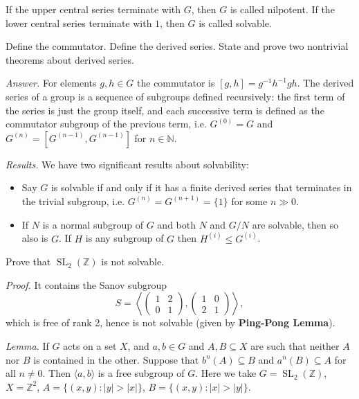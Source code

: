 \documentclass{mathproblems}
\newcommand\Z{\mathbb{Z}}
\begin{document}
\begin{questions}
If the upper central series terminate with $G$, then $G$ is called nilpotent. If the lower central series terminate with $1$, then $G$ is called solvable.


\miquestion
{\color{blue} Define the commutator. Define the derived series. State and prove two nontrivial theorems about derived series.}

\textit{Answer.} For elements $g,h\in G$ the commutator is $[g,h]=g^{-1}h^{-1}gh$. The derived series of a group is a sequence of subgroups defined recursively: the first term of the series is just the group itself, and each successive term is defined as the commutator subgroup of the previous term, i.e. $G^{(0)}=G$ and $G^{(n)}=[G^{(n-1)},G^{(n-1)}]$ for $n\in\mathbb{N}$. 

\textit{Results.} We have two significant results about solvability: \vspace{-4pt}
\begin{itemize}
\item Say $G$ is solvable if and only if it has a finite derived series that terminates in the trivial subgroup, i.e. $G^{(n)}=G^{(n+1)}=\{1\}$ for some $n\gg 0$.
\item If $N$ is a normal subgroup of $G$ and both $N$ and $G/N$ are solvable, then so also is $G$. If $H$ is any subgroup of $G$ then $H^{(i)}\leq G^{(i)}$.
\end{itemize}



\miquestion
{\color{blue} Prove that $\operatorname{SL}_2(\Z)$ is not solvable.}

\textit{Proof.} It contains the Sanov subgroup
$$
S=\left\langle \begin{pmatrix}1&2\\0&1\end{pmatrix},\begin{pmatrix}1&0\\2&1\end{pmatrix}\right\rangle,
$$
which is free of rank 2, hence is not solvable (given by {\color{violet}\textbf{Ping-Pong Lemma}}).

{\color{violet}
\textit{Lemma.} If $G$ acts on a set $X$, and $a, b \in G$ and $A, B \subseteq X$ are such that neither $A$ nor $B$ is contained in the other. Suppose that $b^{n}(A) \subseteq B$ and $a^{n}(B) \subseteq A$ for all $n\neq 0$. Then $\langle a,b \rangle$ is a free subgroup of $G$. Here we take $G=\operatorname{SL}_2(\Z)$, $X=\Z^2$, $A=\{(x,y):|y|>|x|\}$, $B=\{(x,y):|x|>|y|\}$.
}


\end{questions}
\end{document}
